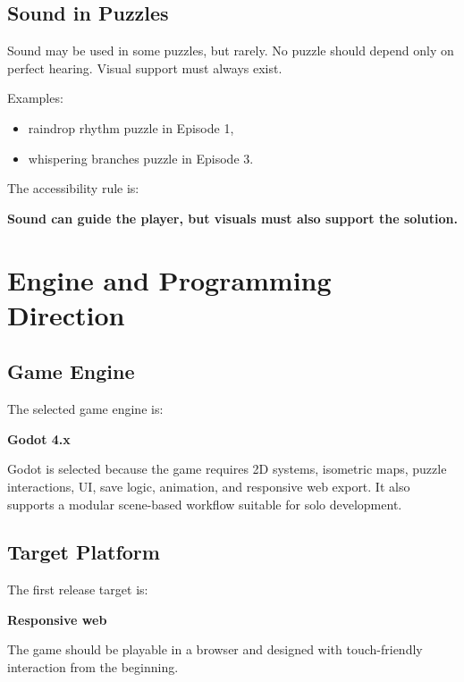\documentclass[12pt]{article}
\begin{document}
\subsection{Sound in Puzzles}

Sound may be used in some puzzles, but rarely. No puzzle should depend only on perfect hearing. Visual support must always exist.

Examples:

\begin{itemize}[leftmargin=*]
    \item raindrop rhythm puzzle in Episode 1,
    \item whispering branches puzzle in Episode 3.
\end{itemize}

The accessibility rule is:

\begin{center}
\textbf{Sound can guide the player, but visuals must also support the solution.}
\end{center}

\section{Engine and Programming Direction}

\subsection{Game Engine}

The selected game engine is:

\begin{center}
\textbf{Godot 4.x}
\end{center}

Godot is selected because the game requires 2D systems, isometric maps, puzzle interactions, UI, save logic, animation, and responsive web export. It also supports a modular scene-based workflow suitable for solo development.

\subsection{Target Platform}

The first release target is:

\begin{center}
\textbf{Responsive web}
\end{center}

The game should be playable in a browser and designed with touch-friendly interaction from the beginning.
\end{document}
